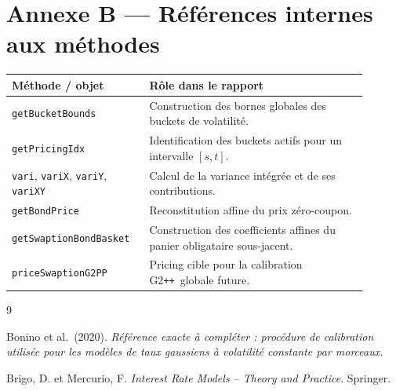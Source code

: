\documentclass[11pt,a4paper]{article}
\newcommand{\Gpp}{G2\texttt{++}}
\newcommand{\code}[1]{\texttt{#1}}
\begin{document}
\section{Annexe B --- Références internes aux méthodes}

\begin{longtable}{p{0.32\linewidth}p{0.58\linewidth}}
\toprule
\textbf{Méthode / objet} & \textbf{Rôle dans le rapport}\\
\midrule
\code{getBucketBounds} & Construction des bornes globales des buckets de volatilité.\\
\code{getPricingIdx} & Identification des buckets actifs pour un intervalle $[s,t]$.\\
\code{vari}, \code{variX}, \code{variY}, \code{variXY} & Calcul de la variance intégrée et de ses contributions.\\
\code{getBondPrice} & Reconstitution affine du prix zéro-coupon.\\
\code{getSwaptionBondBasket} & Construction des coefficients affines du panier obligataire sous-jacent.\\
\code{priceSwaptionG2PP} & Pricing cible pour la calibration \Gpp\ globale future.\\
\bottomrule
\end{longtable}

\begin{thebibliography}{9}

Bonino et al.\ (2020).
\emph{Référence exacte à compléter : procédure de calibration utilisée pour les modèles de taux gaussiens à volatilité constante par morceaux.}

Brigo, D. et Mercurio, F.
\emph{Interest Rate Models -- Theory and Practice}.
Springer.

\end{thebibliography}
\end{document}
